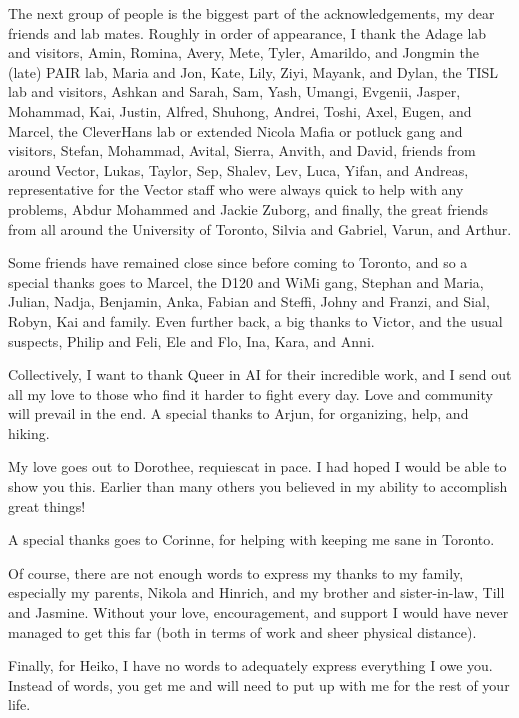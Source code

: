 The next group of people is the biggest part of the acknowledgements, my dear friends and lab mates.
Roughly in order of appearance, I thank
the Adage lab and visitors, Amin, Romina, Avery, Mete, Tyler, Amarildo, and Jongmin the (late) PAIR lab, Maria and Jon, Kate, Lily, Ziyi, Mayank, and Dylan, the TISL lab and visitors, Ashkan and Sarah, Sam, Yash, Umangi, Evgenii, Jasper, Mohammad, Kai, Justin, Alfred, Shuhong, Andrei, Toshi, Axel, Eugen, and Marcel, the CleverHans lab or extended Nicola Mafia or potluck gang and visitors, Stefan, Mohammad, Avital, Sierra, Anvith, and David, friends from around Vector, Lukas, Taylor, Sep, Shalev, Lev, Luca, Yifan, and Andreas, representative for the Vector staff who were always quick to help with any problems, Abdur Mohammed and Jackie Zuborg, and finally, the great friends from all around the University of Toronto, Silvia and Gabriel, Varun, and Arthur.

Some friends have remained close since before coming to Toronto, and so a special thanks goes to Marcel, the D120 and WiMi gang, Stephan and Maria, Julian, Nadja, Benjamin, Anka, Fabian and Steffi, Johny and Franzi, and Sial, Robyn, Kai and family. Even further back, a big thanks to Victor, and the usual suspects, Philip and Feli, Ele and Flo, Ina, Kara, and Anni.

Collectively, I want to thank Queer in AI for their incredible work, and I send out all my love to those who find it harder to fight every day.
Love and community will prevail in the end.
A special thanks to Arjun, for organizing, help, and hiking.

My love goes out to Dorothee, requiescat in pace.
I had hoped I would be able to show you this.
Earlier than many others you believed in my ability to accomplish great things!

A special thanks goes to Corinne, for helping with keeping me sane in Toronto.

Of course, there are not enough words to express my thanks to my family, especially my parents, Nikola and Hinrich, and my brother and sister-in-law, Till and Jasmine.
Without your love, encouragement, and support I would have never managed to get this far (both in terms of work and sheer physical distance).

Finally, for Heiko, I have no words to adequately express everything I owe you.
Instead of words, you get me and will need to put up with me for the rest of your life.

